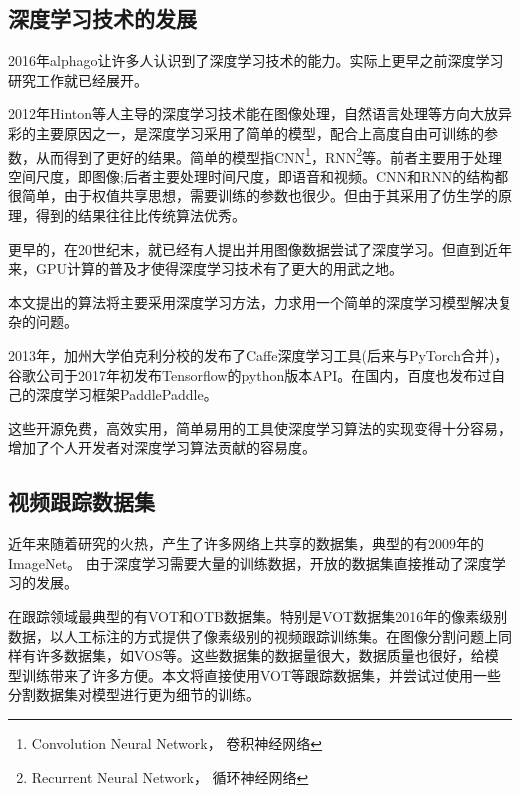 \subsection{深度学习技术的发展}
2016年alphago\supercite{wang2016does}让许多人认识到了深度学习技术的能力。实际上更早之前深度学习研究工作就已经展开。
\par
2012年Hinton等人主导的深度学习技术能在图像处理，自然语言处理等方向大放异彩的主要原因之一，是深度学习采用了简单的模型，配合上高度自由可训练的参数，从而得到了更好的结果。简单的模型指CNN\footnote{Convolution Neural Network， 卷积神经网络}，RNN\footnote{Recurrent Neural Network， 循环神经网络}等。前者主要用于处理空间尺度，即图像;后者主要处理时间尺度，即语音和视频。CNN和RNN的结构都很简单，由于权值共享思想，需要训练的参数也很少。但由于其采用了仿生学的原理，得到的结果往往比传统算法优秀。
\par
更早的，在20世纪末，就已经有人提出并用图像数据尝试了深度学习\supercite{lecun1998gradient}。但直到近年来，GPU计算的普及才使得深度学习技术有了更大的用武之地。
\par
本文提出的算法将主要采用深度学习方法，力求用一个简单的深度学习模型解决复杂的问题。

\par
2013年，加州大学伯克利分校的发布了Caffe\supercite{jia2014caffe}深度学习工具(后来与PyTorch\supercite{paszke2017automatic}合并)，谷歌公司于2017年初发布Tensorflow\supercite{abadi2016tensorflow}的python版本API。在国内，百度也发布过自己的深度学习框架PaddlePaddle\supercite{recognize_digits_paddle}。
\par
这些开源免费，高效实用，简单易用的工具使深度学习算法的实现变得十分容易，增加了个人开发者对深度学习算法贡献的容易度。

\subsection{视频跟踪数据集}
近年来随着研究的火热，产生了许多网络上共享的数据集，典型的有2009年的ImageNet\supercite{imagenet_cvpr09}。
由于深度学习需要大量的训练数据，开放的数据集直接推动了深度学习的发展。
\par
在跟踪领域最典型的有VOT\supercite{VOT_TPAMI}和OTB\supercite{WuLimYang13}数据集。特别是VOT数据集2016年的像素级别数据\supercite{Vojir-TR-2017-01}，以人工标注的方式提供了像素级别的视频跟踪训练集。在图像分割问题上同样有许多数据集，如VOS\supercite{Cae+17}等。这些数据集的数据量很大，数据质量也很好，给模型训练带来了许多方便。本文将直接使用VOT等跟踪数据集，并尝试过使用一些分割数据集对模型进行更为细节的训练。

